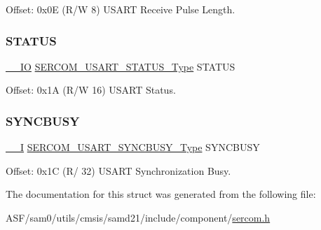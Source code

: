 Offset\+: 0x0E (R/W 8) U\+S\+A\+RT Receive Pulse Length. 

\mbox{\label{struct_sercom_usart_af2fa4c08ef332c01ef46d739b16fa7e8}} 
\subsubsection{\texorpdfstring{STATUS}{STATUS}}
{\footnotesize\ttfamily \mbox{\hyperlink{core__cm0plus_8h_aec43007d9998a0a0e01faede4133d6be}{\+\_\+\+\_\+\+IO}} \mbox{\hyperlink{union_s_e_r_c_o_m___u_s_a_r_t___s_t_a_t_u_s___type}{S\+E\+R\+C\+O\+M\+\_\+\+U\+S\+A\+R\+T\+\_\+\+S\+T\+A\+T\+U\+S\+\_\+\+Type}} S\+T\+A\+T\+US}



Offset\+: 0x1A (R/W 16) U\+S\+A\+RT Status. 

\mbox{\label{struct_sercom_usart_a9e26ef039a3b22ffae20b3dbf58aca8e}} 
\subsubsection{\texorpdfstring{SYNCBUSY}{SYNCBUSY}}
{\footnotesize\ttfamily \mbox{\hyperlink{core__cm0plus_8h_af63697ed9952cc71e1225efe205f6cd3}{\+\_\+\+\_\+I}} \mbox{\hyperlink{union_s_e_r_c_o_m___u_s_a_r_t___s_y_n_c_b_u_s_y___type}{S\+E\+R\+C\+O\+M\+\_\+\+U\+S\+A\+R\+T\+\_\+\+S\+Y\+N\+C\+B\+U\+S\+Y\+\_\+\+Type}} S\+Y\+N\+C\+B\+U\+SY}



Offset\+: 0x1C (R/ 32) U\+S\+A\+RT Synchronization Busy. 



The documentation for this struct was generated from the following file\+:\begin{DoxyCompactItemize}
\item 
A\+S\+F/sam0/utils/cmsis/samd21/include/component/\mbox{\hyperlink{utils_2cmsis_2samd21_2include_2component_2sercom_8h}{sercom.\+h}}\end{DoxyCompactItemize}
